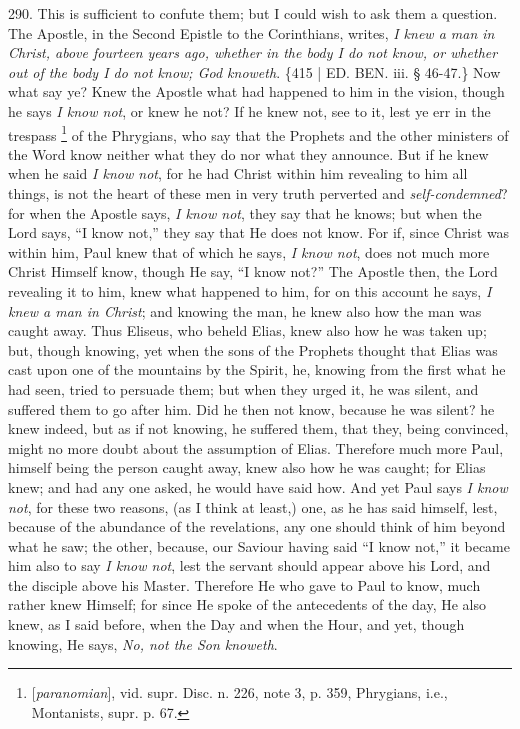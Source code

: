 290. This is
sufficient to confute them; but I could wish to ask them a question.
The Apostle, in the Second Epistle to the Corinthians, writes, \emph{I
knew a man in Christ, above fourteen years ago, whether in the body I
do not know, or whether out of the body I do not know; God knoweth}.
\{415 | ED. BEN.
iii. § 46-47.\} Now what say ye? Knew the Apostle what had happened to
him in the vision, though he says \emph{I know not}, or knew he not?
If he knew not, see to it, lest ye err in the trespass \footnote{[\emph{paranomian}], vid. supr. Disc. n. 226, note 3, p. 359,
Phrygians, i.e., Montanists, supr. p. 67.} of the Phrygians, who say that the Prophets and the other
ministers of the Word know neither what they do nor what they
announce. But if he knew when he said \emph{I know not}, for he had
Christ within him revealing to him all things, is not the heart of
these men in very truth perverted and \emph{self-condemned}? for when
the Apostle says, \emph{I know not}, they say that he knows; but when
the Lord says, ``I know not,'' they say that He does not know. For if,
since Christ was within him, Paul knew that of which he says, \emph{I
know not}, does not much more Christ Himself know, though He say, ``I
know not?'' The Apostle then, the Lord revealing it to him, knew what
happened to him, for on this account he says, \emph{I knew a man in
Christ}; and knowing the man, he knew also how the man was caught
away. Thus Eliseus, who beheld Elias, knew also how he was taken up;
but, though knowing, yet when the sons of the Prophets thought that
Elias was cast upon one of the mountains by the Spirit, he, knowing
from the first what he had seen, tried to persuade them; but when they
urged it, he was silent, and suffered them to go after him. Did he
then not know, because he was silent? he knew indeed, but as if not
knowing, he suffered them, that they, being convinced, might no more
doubt about the assumption of Elias. Therefore much more Paul, himself
being the person caught away, knew also how he was caught; for Elias
knew; and had any one asked, he would have said how. And yet Paul says
\emph{I know not}, for these two reasons, (as I think at least,) one,
as he has said himself, lest, because of the abundance of the
revelations, any one should think of him beyond what he saw; the
other, because, our Saviour having said ``I know not,'' it became
him also to say \emph{I know not}, lest the servant should appear
above his Lord, and the disciple above his Master. Therefore He who
gave to Paul to know, much rather knew Himself; for since He spoke of
the antecedents of the day, He also knew, as I said before, when the
Day and when the Hour, and yet, though knowing, He says, \emph{No, not
the Son knoweth}.


